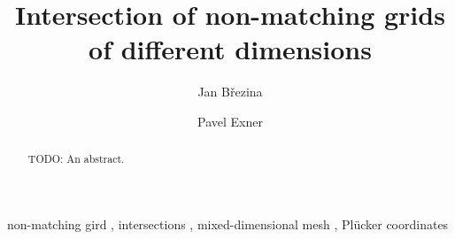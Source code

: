 \documentclass{elsarticle}
\newcommand{\plucker}{Pl\"{u}cker }
\begin{document}
\begin{frontmatter}



\title{Intersection of non-matching grids of different dimensions}


\author[adr]{Jan B{\v r}ezina}

\author[adr]{Pavel Exner}

\address[adr]{Technical University of Liberec, Studentsk{\' a} 1402/2, 461 17 Liberec 1, Czech Republic}


\begin{abstract}
TODO: An abstract.
\end{abstract}

\begin{keyword}
non-matching gird \sep 
intersections \sep
mixed-dimensional mesh \sep
\plucker coordinates




\end{keyword}

\end{frontmatter}
\end{document}
